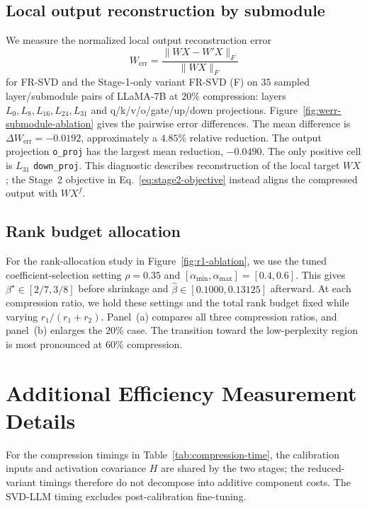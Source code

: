 \subsection{Local output reconstruction by submodule}\label{app:submodule-reconstruction}
We measure the normalized local output reconstruction error
\begin{equation}
W_{\mathrm{err}}=\frac{\|WX-W'X\|_F}{\|WX\|_F}
\label{eq:app-werr}
\end{equation}
for FR-SVD and the Stage-1-only variant FR-SVD (F) on $35$ sampled layer/submodule pairs of LLaMA-7B at $20\%$ compression: layers $L_0,L_8,L_{16},L_{24},L_{31}$ and q/k/v/o/gate/up/down projections. Figure~\ref{fig:werr-submodule-ablation} gives the pairwise error differences. The mean difference is $\Delta W_{\mathrm{err}}=-0.0192$, approximately a $4.85\%$ relative reduction. The output projection \texttt{o\_proj} has the largest mean reduction, $-0.0490$. The only positive cell is $L_{31}$ \texttt{down\_proj}. This diagnostic describes reconstruction of the local target $WX$; the Stage~2 objective in Eq.~\eqref{eq:stage2-objective} instead aligns the compressed output with $WX^f$.



\subsection{Rank budget allocation}\label{app:rank-allocation}
For the rank-allocation study in Figure~\ref{fig:r1-ablation}, we use the tuned coefficient-selection setting $\rho=0.35$ and $[\alpha_{\min},\alpha_{\max}]=[0.4,0.6]$. This gives $\beta^\star\in[2/7,3/8]$ before shrinkage and $\widehat\beta\in[0.1000,0.13125]$ afterward. At each compression ratio, we hold these settings and the total rank budget fixed while varying $r_1/(r_1+r_2)$. Panel~(a) compares all three compression ratios, and panel~(b) enlarges the $20\%$ case. The transition toward the low-perplexity region is most pronounced at $60\%$ compression.



\section{Additional Efficiency Measurement Details}\label{app:efficiency}

For the compression timings in Table~\ref{tab:compression-time}, the calibration inputs and activation covariance $H$ are shared by the two stages; the reduced-variant timings therefore do not decompose into additive component costs. The SVD-LLM timing excludes post-calibration fine-tuning.

